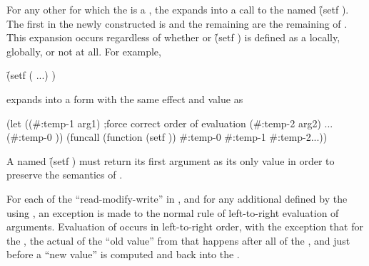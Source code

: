 \endsubsubsection%


For any other  for which the  is a
 ,
the   expands into a call 
to the  named \f{(setf )}.
The first  in the newly constructed 
is  and the
     remaining  are the remaining  of
     .
This expansion occurs regardless of whether  or \f{(setf )}
is defined as a  locally, globally, or not at all.
For example,

\f{(setf (   ...) )}

expands into a form with the same effect and value as

\code
 (let ((#:temp-1 arg1)          ;force correct order of evaluation
       (#:temp-2 arg2)
       ...
       (#:temp-0 ))
   (funcall (function (setf )) #:temp-0 #:temp-1 #:temp-2...))
\endcode

A  named \f{(setf )} must return its first argument
as its only value in order to preserve the semantics of .

\endsubsubsection%



\endsubSection%



For each of the ``read-modify-write''  in \thenextfigure, 
and for any additional  
defined by the  using ,
an exception is made to the normal rule of left-to-right evaluation of arguments.
Evaluation of   occurs in left-to-right order,
with the exception that for the  , the actual
 of the ``old value'' from that  happens 
after all of the   , 
and just before a ``new value'' is computed and  back into the .

